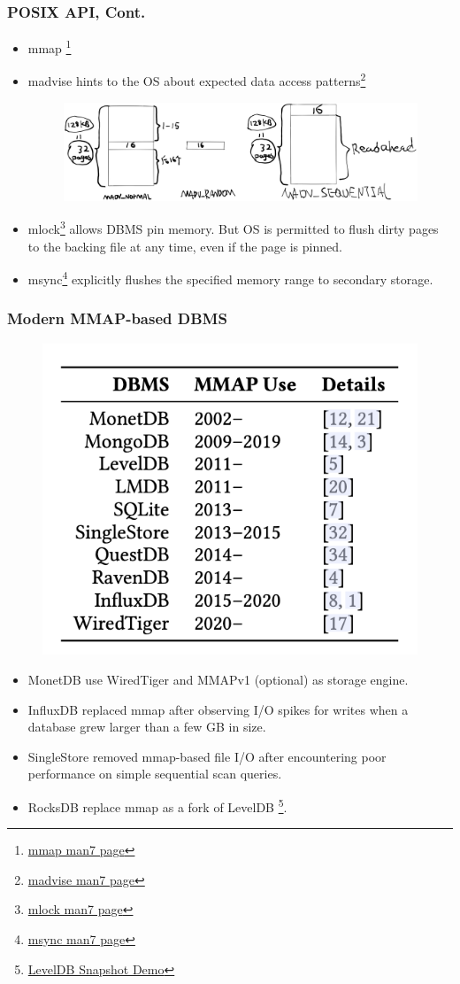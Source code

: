 \documentclass[slidestop,mathsrif]{beamer}
\begin{document}
\begin{frame}
	\frametitle{POSIX API, Cont.}
		\begin{itemize}
			\item mmap \footnote[frame]{\href{https://man7.org/linux/man-pages/man2/mmap.2.html}{mmap man7 page}}
			\item madvise hints to the OS about expected data access patterns\footnote[frame]{\href{https://man7.org/linux/man-pages/man2/madvise.2.html}{madvise man7 page}}
			\begin{figure}[h]
				\includegraphics[width=0.99\linewidth]{images/readahead.png}
			\end{figure}
			\item mlock\footnote[frame]{\href{https://man7.org/linux/man-pages/man2/mlock.2.html}{mlock man7 page}} allows DBMS pin memory. {\color{red}But OS is permitted to flush dirty pages to the backing file at any time, even if the page is pinned.}
			\item msync\footnote[frame]{\href{https://man7.org/linux/man-pages/man2/msync.2.html}{msync man7 page}} explicitly flushes the specified memory range to secondary storage.
		\end{itemize}
\end{frame}

\begin{frame}
	\frametitle{Modern MMAP-based DBMS}
	 \begin{figure}[h]
		\includegraphics[width=0.35\linewidth]{images/mmap.png}
	\end{figure}
	\pause
	\begin{itemize}
		\item<1-> MonetDB use WiredTiger and MMAPv1 (optional) as storage engine.
		\item<2-> InfluxDB replaced mmap after observing I/O spikes for writes when a database grew larger than a few GB in size.
		\item<3-> SingleStore removed mmap-based file I/O after encountering poor performance on simple sequential scan queries.
		\item<4-> RocksDB replace mmap as a fork of LevelDB
		\footnote[frame]{\href{https://github.com/Ethanzjp/Snippets/tree/master/Level_Snapshot}{LevelDB Snapshot Demo}}.
	\end{itemize}
\end{frame}
\end{document}
